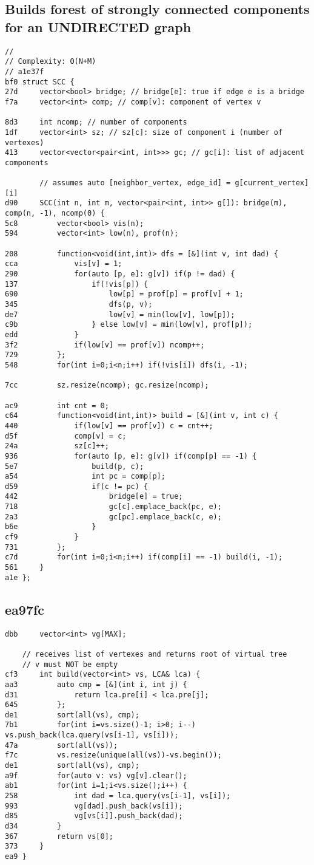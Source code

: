 \documentclass[11pt, a4paper, twoside]{article}
\begin{document}
\subsection{Builds forest of strongly connected components for an UNDIRECTED graph}
\begin{lstlisting}
//
// Complexity: O(N+M)
// a1e37f
bf0 struct SCC {
27d 	vector<bool> bridge; // bridge[e]: true if edge e is a bridge
f7a 	vector<int> comp; // comp[v]: component of vertex v
    
8d3 	int ncomp; // number of components
1df 	vector<int> sz; // sz[c]: size of component i (number of vertexes)
413 	vector<vector<pair<int, int>>> gc; // gc[i]: list of adjacent components
    				
    	// assumes auto [neighbor_vertex, edge_id] = g[current_vertex][i]
d90 	SCC(int n, int m, vector<pair<int, int>> g[]): bridge(m), comp(n, -1), ncomp(0) {
5c8 		vector<bool> vis(n);
594 		vector<int> low(n), prof(n);
    
208 		function<void(int,int)> dfs = [&](int v, int dad) {
cca 			vis[v] = 1;
290 			for(auto [p, e]: g[v]) if(p != dad) {
137 				if(!vis[p]) {
690 					low[p] = prof[p] = prof[v] + 1;
345 					dfs(p, v);
de7 					low[v] = min(low[v], low[p]);
c9b 				} else low[v] = min(low[v], prof[p]);
edd 			}
3f2 			if(low[v] == prof[v]) ncomp++;
729 		};
548 		for(int i=0;i<n;i++) if(!vis[i]) dfs(i, -1);
    
7cc 		sz.resize(ncomp); gc.resize(ncomp);
    
ac9 		int cnt = 0;
c64 		function<void(int,int)> build = [&](int v, int c) {
440 			if(low[v] == prof[v]) c = cnt++;
d5f 			comp[v] = c;
24a 			sz[c]++;
936 			for(auto [p, e]: g[v]) if(comp[p] == -1) {
5e7 				build(p, c);
a54 				int pc = comp[p];
d59 				if(c != pc) {
442 					bridge[e] = true;
718 					gc[c].emplace_back(pc, e);
2a3 					gc[pc].emplace_back(c, e);
b6e 				}
cf9 			}
731 		};
c7d 		for(int i=0;i<n;i++) if(comp[i] == -1) build(i, -1);
561 	}
a1e };
\end{lstlisting}

\subsection{ea97fc}
\begin{lstlisting}
dbb 	vector<int> vg[MAX];

	// receives list of vertexes and returns root of virtual tree
	// v must NOT be empty
cf3 	int build(vector<int> vs, LCA& lca) {
aa3 		auto cmp = [&](int i, int j) {
d31 			return lca.pre[i] < lca.pre[j];
645 		};
de1 		sort(all(vs), cmp);
7b1 		for(int i=vs.size()-1; i>0; i--) vs.push_back(lca.query(vs[i-1], vs[i]));
47a 		sort(all(vs));
f7c 		vs.resize(unique(all(vs))-vs.begin());
de1 		sort(all(vs), cmp);
a9f 		for(auto v: vs) vg[v].clear();
ab1 		for(int i=1;i<vs.size();i++) {
258 			int dad = lca.query(vs[i-1], vs[i]);
993 			vg[dad].push_back(vs[i]);
d85 			vg[vs[i]].push_back(dad);
d34 		}
367 		return vs[0];
373 	}
ea9 }
\end{lstlisting}
\end{document}
